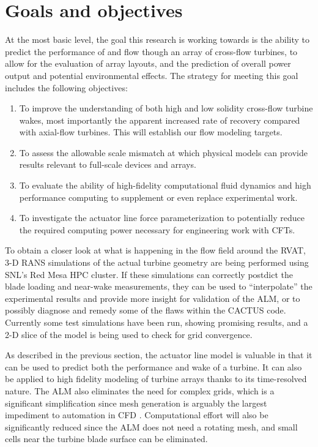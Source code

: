 \section{Goals and objectives}

At the most basic level, the goal this research is working towards is the
ability to predict the performance of and flow though an array of cross-flow
turbines, to allow for the evaluation of array layouts, and the prediction of
overall power output and potential environmental effects. The strategy for
meeting this goal includes the following objectives:

\begin{enumerate}

	\item To improve the understanding of both high and low solidity cross-flow
    turbine wakes, most importantly the apparent increased rate of recovery
    compared with axial-flow turbines. This will establish our flow modeling
    targets.
	
	\item To assess the allowable scale mismatch at which physical models can
	provide results relevant to full-scale devices and arrays.
	
	\item To evaluate the ability of high-fidelity computational fluid dynamics and
	high performance computing to supplement or even replace experimental work.
    
    \item To investigate the actuator line force parameterization to potentially
    reduce the required computing power necessary for engineering work with
    CFTs.
\end{enumerate}

To obtain a closer look at what is happening in the flow field around the RVAT,
3-D RANS simulations of the actual turbine geometry are being performed using
SNL's Red Mesa HPC cluster. If these simulations can correctly postdict the
blade loading and near-wake measurements, they can be used to ``interpolate''
the experimental results and provide more insight for validation of the ALM, or
to possibly diagnose and remedy some of the flaws within the CACTUS code.
Currently some test simulations have been run, showing promising results, and a
2-D slice of the model is being used to check for grid convergence.

As described in the previous section, the actuator line model is valuable in
that it can be used to predict both the performance and wake of a turbine. It
can also be applied to high fidelity modeling of turbine arrays thanks to its
time-resolved nature. The ALM also eliminates the need for complex grids, which
is a significant simplification since mesh generation is arguably the largest
impediment to automation in CFD \cite{Slotnick2014}. Computational effort will
also be significantly reduced since the ALM does not need a rotating mesh, and
small cells near the turbine blade surface can be eliminated.

